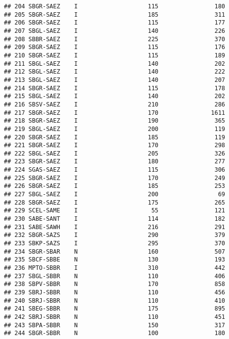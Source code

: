 \documentclass[
]{article}
\begin{document}
\begin{verbatim}
## 204 SBGR-SAEZ    I                    115                180
## 205 SBGR-SAEZ    I                    185                311
## 206 SBGR-SAEZ    I                    115                177
## 207 SBGL-SAEZ    I                    140                226
## 208 SBBR-SAEZ    I                    225                370
## 209 SBGR-SAEZ    I                    115                176
## 210 SBGR-SAEZ    I                    115                189
## 211 SBGL-SAEZ    I                    140                202
## 212 SBGL-SAEZ    I                    140                222
## 213 SBGL-SAEZ    I                    140                207
## 214 SBGR-SAEZ    I                    115                178
## 215 SBGL-SAEZ    I                    140                202
## 216 SBSV-SAEZ    I                    210                286
## 217 SBGR-SAEZ    I                    170               1611
## 218 SBGR-SAEZ    I                    190                365
## 219 SBGL-SAEZ    I                    200                119
## 220 SBGR-SAEZ    I                    185                119
## 221 SBGR-SAEZ    I                    170                298
## 222 SBGL-SAEZ    I                    205                326
## 223 SBGR-SAEZ    I                    180                277
## 224 SGAS-SAEZ    I                    115                306
## 225 SBGR-SAEZ    I                    170                249
## 226 SBGR-SAEZ    I                    185                253
## 227 SBGL-SAEZ    I                    200                 69
## 228 SBGR-SAEZ    I                    175                265
## 229 SCEL-SAME    I                     55                121
## 230 SABE-SANT    I                    114                182
## 231 SABE-SAWH    I                    216                291
## 232 SBGR-SAZS    I                    290                379
## 233 SBKP-SAZS    I                    295                370
## 234 SBGR-SBAR    N                    160                507
## 235 SBCF-SBBE    N                    130                193
## 236 MPTO-SBBR    I                    310                442
## 237 SBGL-SBBR    N                    110                406
## 238 SBPV-SBBR    N                    170                858
## 239 SBRJ-SBBR    N                    110                456
## 240 SBRJ-SBBR    N                    110                410
## 241 SBEG-SBBR    N                    175                895
## 242 SBRJ-SBBR    N                    110                451
## 243 SBPA-SBBR    N                    150                317
## 244 SBGR-SBBR    N                    100                180

\end{verbatim}
\end{document}
